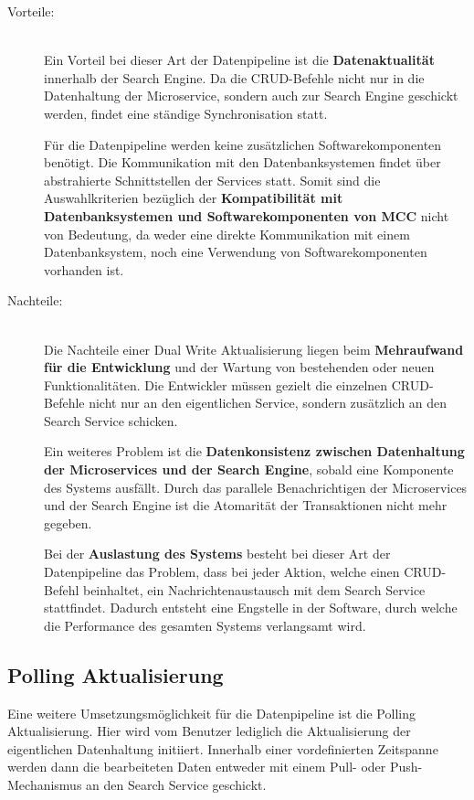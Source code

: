 \begin{description}
    \item[Vorteile:]\hfill \\
    Ein Vorteil bei dieser Art der Datenpipeline ist die \textbf{Datenaktualität} innerhalb der Search Engine. Da die CRUD-Befehle nicht nur in die Datenhaltung der Microservice, sondern auch zur Search Engine geschickt werden, findet eine ständige Synchronisation statt.
    
    Für die Datenpipeline werden keine zusätzlichen Softwarekomponenten benötigt. Die Kommunikation mit den Datenbanksystemen findet über abstrahierte Schnittstellen der Services statt. Somit sind die Auswahlkriterien bezüglich der \textbf{Kompatibilität mit Datenbanksystemen und Softwarekomponenten von MCC} nicht von Bedeutung, da weder eine direkte Kommunikation mit einem Datenbanksystem, noch eine Verwendung von Softwarekomponenten vorhanden ist.
    
    \item[Nachteile:]\hfill \\
    Die Nachteile einer Dual Write Aktualisierung liegen beim \textbf{Mehraufwand für die Entwicklung} und der Wartung von bestehenden oder neuen Funktionalitäten. Die Entwickler müssen gezielt die einzelnen CRUD-Befehle nicht nur an den eigentlichen Service, sondern zusätzlich an den Search Service schicken.

    Ein weiteres Problem ist die \textbf{Datenkonsistenz zwischen Datenhaltung der Microservices und der Search Engine}, sobald eine Komponente des Systems ausfällt. Durch das parallele Benachrichtigen der Microservices und der Search Engine ist die Atomarität der Transaktionen nicht mehr gegeben.

    Bei der \textbf{Auslastung des Systems} besteht bei dieser Art der Datenpipeline das Problem, dass bei jeder Aktion, welche einen CRUD-Befehl beinhaltet, ein Nachrichtenaustausch mit dem Search Service stattfindet. Dadurch entsteht eine Engstelle in der Software, durch welche die Performance des gesamten Systems verlangsamt wird.

\end{description}

\subsection{Polling Aktualisierung\label{subsec4.1.3:Unterunterpunkt-3}}

Eine weitere Umsetzungsmöglichkeit für die Datenpipeline ist die \glqq Polling Aktualisierung\grqq{}. Hier wird vom Benutzer lediglich die Aktualisierung der eigentlichen Datenhaltung initiiert. Innerhalb einer vordefinierten Zeitspanne werden dann die bearbeiteten Daten entweder mit einem Pull- oder Push-Mechanismus an den Search Service geschickt.

